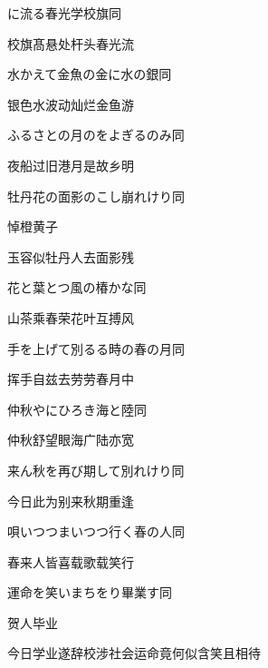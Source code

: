 \begin{haiku}
    {\FH {}に流る春光学校旗}\hfill{\FH 同}

    {\FK 校旗髙悬处杆头春光流}
\end{haiku}

\begin{haiku}
    {\FH 水かえて金魚の金に水の銀}\hfill{\FH 同}

    {\FK 银色水波动灿烂金鱼游}
\end{haiku}

\begin{haiku}
    {\FH ふるさとの月のをよぎるのみ}\hfill{\FH 同}

    {\FK 夜船过旧港月是故乡明}
\end{haiku}

\begin{haiku}
    {\FH 牡丹花の面影のこし崩れけり}\hfill{\FH 同}

    {\FK 悼橙黄子}

    {\FK 玉容似牡丹人去面影残}
\end{haiku}

\begin{haiku}
    {\FH 花と葉とつ風の椿かな}\hfill{\FH 同}

    {\FK 山茶乘春荣花叶互搏风}
\end{haiku}

\begin{haiku}
    {\FH 手を上げて別るる時の春の月}\hfill{\FH 同}

    {\FK 挥手自兹去劳劳春月中}
\end{haiku}

\begin{haiku}
    {\FH 仲秋やにひろき海と陸}\hfill{\FH 同}

    {\FK 仲秋舒望眼海广陆亦宽}
\end{haiku}

\begin{haiku}
    {\FH 来ん秋を再び期して別れけり}\hfill{\FH 同}

    {\FK 今日此为别来秋期重逢}
\end{haiku}

\begin{haiku}
    {\FH 唄いつつまいつつ行く春の人}\hfill{\FH 同}

    {\FK 春来人皆喜载歌载笑行}
\end{haiku}

\begin{haiku}
    {\FH 運命を笑いまちをり畢業す}\hfill{\FH 同}

    {\FK 贺人毕业}

    {\FK 今日学业遂辞校涉社会运命竟何似含笑且相待}
\end{haiku}

